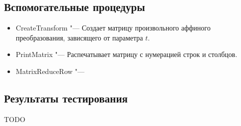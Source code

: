 \documentclass[../main.tex]{subfiles}
\begin{document}
\subsection{Вспомогательные процедуры}
\begin{itemize}
\item {\ttfamily CreateTransform} "--- Создает матрицу произвольного аффиного преобразования, зависящего от параметра $t$. 

\item {\ttfamily PrintMatrix} "--- Распечатывает матрицу с нумерацией строк и столбцов.

\item {\ttfamily MatrixReduceRow} "---

\end{itemize}

\subsection{Результаты тестирования}
TODO
\end{document}
